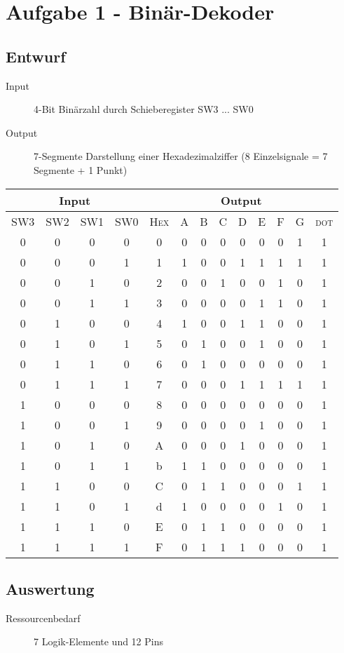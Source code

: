 \section{Aufgabe 1 - Binär-Dekoder}
\subsection{Entwurf}
\begin{description}
	\item[Input] 4-Bit Binärzahl durch Schieberegister SW3 ... SW0
	\item[Output] 7-Segmente Darstellung einer Hexadezimalziffer (8 Einzelsignale = 7 Segmente + 1 Punkt)
\end{description}

\begin{tabular}{|c|c|c|c||c|c|c|c|c|c|c|c|c|}
\hline
\multicolumn{4}{|c|}{Input} & \multicolumn{9}{|c|}{Output} \\
\hline
\textsc{SW3} & \textsc{SW2} & \textsc{SW1} & \textsc{SW0} & 
\textsc{Hex} & \textsc{A} & \textsc{B} & \textsc{C} & \textsc{D} & \textsc{E} & \textsc{F} & \textsc{G} & \textsc{dot} \\ 
\hline
\hline
0 & 0 & 0 & 0 & 0 & 0 & 0 & 0 & 0 & 0 & 0 & 1 & 1 \\ 
0 & 0 & 0 & 1 & 1 & 1 & 0 & 0 & 1 & 1 & 1 & 1 & 1 \\
0 & 0 & 1 & 0 & 2 & 0 & 0 & 1 & 0 & 0 & 1 & 0 & 1 \\
0 & 0 & 1 & 1 & 3 & 0 & 0 & 0 & 0 & 1 & 1 & 0 & 1 \\
0 & 1 & 0 & 0 & 4 & 1 & 0 & 0 & 1 & 1 & 0 & 0 & 1 \\
0 & 1 & 0 & 1 & 5 & 0 & 1 & 0 & 0 & 1 & 0 & 0 & 1 \\
0 & 1 & 1 & 0 & 6 & 0 & 1 & 0 & 0 & 0 & 0 & 0 & 1 \\
0 & 1 & 1 & 1 & 7 & 0 & 0 & 0 & 1 & 1 & 1 & 1 & 1 \\
1 & 0 & 0 & 0 & 8 & 0 & 0 & 0 & 0 & 0 & 0 & 0 & 1 \\
1 & 0 & 0 & 1 & 9 & 0 & 0 & 0 & 0 & 1 & 0 & 0 & 1 \\
1 & 0 & 1 & 0 & A & 0 & 0 & 0 & 1 & 0 & 0 & 0 & 1 \\
1 & 0 & 1 & 1 & b & 1 & 1 & 0 & 0 & 0 & 0 & 0 & 1 \\
1 & 1 & 0 & 0 & C & 0 & 1 & 1 & 0 & 0 & 0 & 1 & 1 \\
1 & 1 & 0 & 1 & d & 1 & 0 & 0 & 0 & 0 & 1 & 0 & 1 \\
1 & 1 & 1 & 0 & E & 0 & 1 & 1 & 0 & 0 & 0 & 0 & 1 \\
1 & 1 & 1 & 1 & F & 0 & 1 & 1 & 1 & 0 & 0 & 0 & 1 \\
\hline
\end{tabular}			
			
\subsection{Auswertung}
\begin{description}
\item[Ressourcenbedarf] 7 Logik-Elemente und 12 Pins
\end{description}
